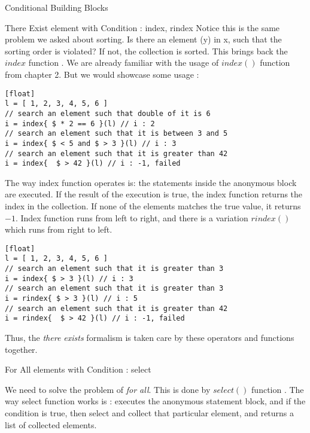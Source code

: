 \begin{section}{Conditional Building Blocks}
\begin{subsection}{There Exist element with Condition : index, rindex }
Notice this is the same problem we asked about sorting. Is there an element (y) in x, 
such that the sorting order is violated? If not, the collection is sorted.
This brings back the $index$ function .
We are already familiar with the usage of $index()$ function from chapter 2.
But we would showcase some usage :
 
\begin{lstlisting}[style=JexlStyle][float]
l = [ 1, 2, 3, 4, 5, 6 ]
// search an element such that double of it is 6
i = index{ $ * 2 == 6 }(l) // i : 2 
// search an element such that it is between 3 and 5 
i = index{ $ < 5 and $ > 3 }(l) // i : 3 
// search an element such that it is greater than 42
i = index{  $ > 42 }(l) // i : -1, failed 
\end{lstlisting}

The way index function operates is: the statements inside the anonymous block are executed.
If the result of the execution is true, the index function returns the index in the collection.
If none of the elements matches the true value, it returns $-1$.
Index function runs from left to right, and there is a variation $rindex()$ 
which runs from right to left.


\begin{lstlisting}[style=JexlStyle][float]
l = [ 1, 2, 3, 4, 5, 6 ]
// search an element such that it is greater than 3  
i = index{ $ > 3 }(l) // i : 3
// search an element such that it is greater than 3  
i = rindex{ $ > 3 }(l) // i : 5 
// search an element such that it is greater than 42
i = rindex{  $ > 42 }(l) // i : -1, failed 
\end{lstlisting}

Thus, the \emph{there exists} formalism is taken care by these operators and functions together.

\end{subsection}


\begin{subsection}{For All elements with Condition : select }

We need to solve the problem of \emph{for all}. This is done by $select()$ function .
The way select function works is : executes the anonymous statement block, and if the condition is true, 
then select and collect that particular element, and returns a list of collected elements.


\end{subsection}
\end{section}
